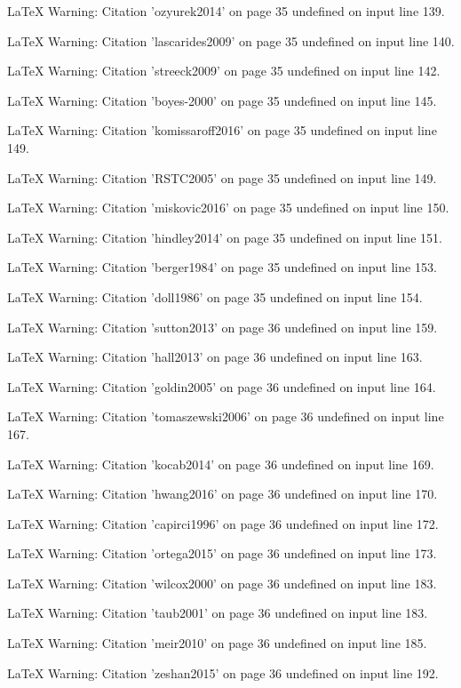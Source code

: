 LaTeX Warning: Citation 'ozyurek2014' on page 35 undefined on input line 139.


LaTeX Warning: Citation 'lascarides2009' on page 35 undefined on input line 140.


LaTeX Warning: Citation 'streeck2009' on page 35 undefined on input line 142.


LaTeX Warning: Citation 'boyes-2000' on page 35 undefined on input line 145.


LaTeX Warning: Citation 'komissaroff2016' on page 35 undefined on input line 149.


LaTeX Warning: Citation 'RSTC2005' on page 35 undefined on input line 149.


LaTeX Warning: Citation 'miskovic2016' on page 35 undefined on input line 150.


LaTeX Warning: Citation 'hindley2014' on page 35 undefined on input line 151.


LaTeX Warning: Citation 'berger1984' on page 35 undefined on input line 153.


LaTeX Warning: Citation 'doll1986' on page 35 undefined on input line 154.


LaTeX Warning: Citation 'sutton2013' on page 36 undefined on input line 159.


LaTeX Warning: Citation 'hall2013' on page 36 undefined on input line 163.


LaTeX Warning: Citation 'goldin2005' on page 36 undefined on input line 164.


LaTeX Warning: Citation 'tomaszewski2006' on page 36 undefined on input line 167.


LaTeX Warning: Citation 'kocab2014' on page 36 undefined on input line 169.


LaTeX Warning: Citation 'hwang2016' on page 36 undefined on input line 170.


LaTeX Warning: Citation 'capirci1996' on page 36 undefined on input line 172.


LaTeX Warning: Citation 'ortega2015' on page 36 undefined on input line 173.


LaTeX Warning: Citation 'wilcox2000' on page 36 undefined on input line 183.


LaTeX Warning: Citation 'taub2001' on page 36 undefined on input line 183.


LaTeX Warning: Citation 'meir2010' on page 36 undefined on input line 185.


LaTeX Warning: Citation 'zeshan2015' on page 36 undefined on input line 192.


